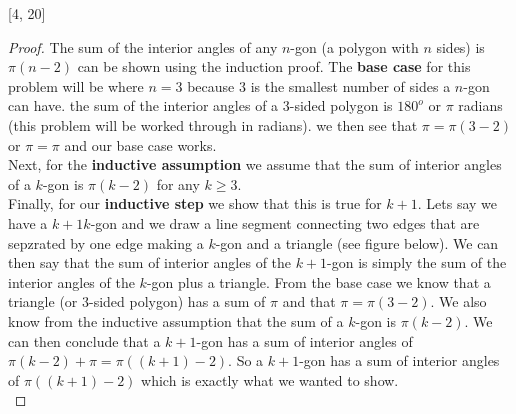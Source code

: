 \documentclass[12pt,letterpaper]{exam}
\begin{document}
[4, 20]
\begin {proof}
The sum of the interior angles of any $n$-gon (a polygon with $n$ sides) is $\pi (n-2)$ can be shown using the induction proof. The \textbf{base case} for this problem will be where $n=3$ because $3$ is the smallest number of sides a $n$-gon can have. the sum of the interior angles of a 3-sided polygon is $180^o$ or $\pi$ radians (this problem will be worked through in radians). we then see that $\pi=\pi(3-2)$ or $\pi=\pi$ and our base case works. 
\\
Next, for the \textbf{inductive assumption} we assume that the sum of interior angles of a  $k$-gon is $\pi (k-2)$ for any $k \ge 3$. 
\\
Finally, for our \textbf{inductive step} we show that this is true for $k+1$. Lets say we have a $k+1 k$-gon and we draw a line segment connecting two edges  that are sepzrated by one edge making a $k$-gon and a triangle (see figure below). We can then say that the sum of interior angles of the $k+1$-gon is simply the sum of the interior angles of the $k$-gon plus a triangle. From the base case we know that a triangle (or 3-sided polygon) has a sum of $\pi$ and that $\pi=\pi(3-2)$. We also know from the inductive assumption that the sum of a $k$-gon is $\pi (k-2)$. We can then conclude that a $k+1$-gon has a sum of interior angles of $\pi (k-2) + \pi=\pi((k+1)-2)$. So a $k+1$-gon has a sum of interior angles of $\pi((k+1)-2)$ which is exactly what we wanted to show.
\\
\end{proof}
\end{document}
